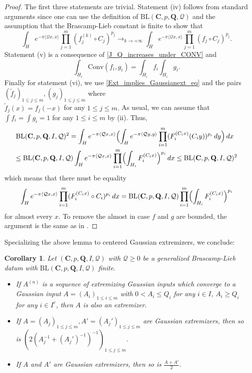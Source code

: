 \documentclass[11pt,a4paper,reqno]{amsart}
\numberwithin{equation}{section}
\newtheorem{corollary}[theorem]{Corollary}
\theoremstyle{definition}
\newcommand{\nm}{\noalign{\smallskip}}
\newcommand{\ds}{\displaystyle}
\renewcommand{\tilde}{\widetilde}
\newcommand{\<}{\ensuremath \leq}
\renewcommand{\>}{\ensuremath \geq}
\renewcommand{\tilde}{\widetilde}
\begin{document}
\begin{proof}
The first three statements are trivial.
Statement (iv) follows from standard arguments since one can use the definition of $\mathrm{BL}(\textbf{C},p,\textbf{Q},\mathcal{Q})$ and the assumption that the Brascamp-Lieb constant is finite to show that $$\int_H e^{-\pi \langle \mathcal Qx,x\rangle}\prod_{j=1}^m (f_j^{(k)}\circ C_j)^{p_j} \rightarrow_{k \rightarrow +\infty }\int_H e^{-\pi \langle \mathcal Q x,x\rangle}\prod_{j=1}^m(f_j \circ C_j)^{p_j}.$$
Statement (v) is a consequence of \cref{J_Q_increases_under_CONV} and $$\int_{H_i}\mathrm{Conv}(f_i,g_i)=\int_{H_i}f_i \int_{H_i}g_i.$$ Finally for statement (vi), we use \cref{Ext_implies_Gaussianext_eq} and the pairs $(\tilde f_j)_{1 \leq j \leq m}, (g_j)_{1 \leq j \leq m}$ where \hfill \\ $\tilde f_j(x)=f_j(-x)$ for any $1 \leq j \leq m.$ As usual, we can assume that $\int f_i=\int g_i=1$ for any $1 \leq i \leq m$ by (ii). Thus, $$\begin{array}{lll}
\ds \mathrm{BL}(\textbf{C},p,\textbf{Q},I,\mathcal Q)^2=\int_H e^{-\pi \langle \mathcal Qx,x\rangle}\Bigl( \int_H e^{-\pi \langle \mathcal Qy,y\rangle} \prod_{i=1}^m (F_i^{(C_ix)}( C_iy))^{p_i} \, dy \Bigl)\, dx \\
\nm 
\leq \ds \mathrm{BL}(\textbf{C},p,\textbf{Q},I,\mathcal Q)\int_H e^{-\pi\langle \mathcal Qx,x\rangle} \prod_{i=1}^m \Bigl(\int_{H_i} F_i^{(C_ix)} \Bigl)^{p_i} \, dx \leq \mathrm{BL}(\textbf{C},p,\textbf{Q},I,\mathcal Q)^2 \end{array}$$ which means that there must be equality $$\int_H e^{-\pi \langle \mathcal Qx,x\rangle}\prod_{i=1}^m (F_i^{(C_ix)}\circ C_i)^{p_i}\, dx=\mathrm{BL}(\textbf{C},p,\textbf{Q},I,\mathcal Q)\prod_{i=1}^m \Bigl( \int_{H_i}F_i^{(C_ix)}\Bigl)^{p_i}$$ for almost every $x.$ To remove the almost in case $f$ and $g$ are bounded, the argument is the same as in \cite{BCCT}. 
\end{proof}


Specializing the above lemma to centered Gaussian extremizers, we conclude: 

\begin{corollary}
    Let $(\textbf{C},p,\textbf{Q},I,\mathcal Q)$ with $\mathcal Q \geq 0$ be a generalized Brascamp-Lieb datum with $\mathrm{BL}(\textbf{C},p,\textbf{Q},I,\mathcal Q)$ finite. \begin{itemize}
        \item [(i)] If $A^{(n)}$ is a sequence of extremizing Gaussian inputs which converge to a Gaussian input $A=(A_i)_{1 \leq i \leq m}$ with $0<A_i \leq Q_i$ for any $i \in I$, $A_i \ge Q_i$ for any $i \in I^c$, then $A$ is also an extremizer. 
        \item[(ii)] If $A=(A_j)_{1 \leq j \leq m}, A'=(A_j')_{1 \leq j \leq m}$ are Gaussian extremizers, then so is $(2(A_j^{-1}+(A_j')^{-1})^{-1})_{1 \leq j \leq m}.$ 
        \item[(iii)] If $A$ and $A'$ are Gaussian extremizers, then so is $\frac{A+A'}{2}.$ 
    \end{itemize} 
\end{corollary}
\end{document}
